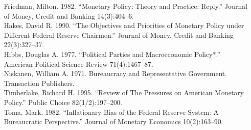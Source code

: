 \documentclass[11pt]{article}
\begin{document}
Friedman, Milton. 1982. “Monetary Policy: Theory and Practice: Reply.” Journal of Money, Credit and Banking 14(3):404–6. \\


Hakes, David R. 1990. “The Objectives and Priorities of Monetary Policy under Different Federal Reserve Chairmen.” Journal of Money, Credit and Banking 22(3):327–37. \\


Hibbs, Douglas A. 1977. “Political Parties and Macroeconomic Policy*.” American Political Science Review 71(4):1467–87. \\


Niskanen, William A. 1971. Bureaucracy and Representative Government. Transaction Publishers. \\


Timberlake, Richard H. 1995. “Review of The Pressures on American Monetary Policy.” Public Choice 82(1/2):197–200. \\


Toma, Mark. 1982. “Inflationary Bias of the Federal Reserve System: A Bureaucratic Perspective.” Journal of Monetary Economics 10(2):163–90.
\end{document}
